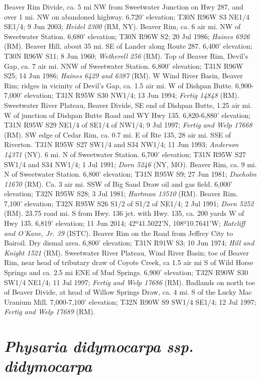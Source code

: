 Beaver Rim Divide, ca. 5 mi NW from Sweetwater Junction on Hwy 287, and over 1
mi. NW on abandoned highway. 6,720' elevation; T30N R96W S3 NE1/4 SE1/4;
9 Jun 2003; \textit{Heidel 2300} (RM, NY).
Beaver Rim, ca. 6 air mi. NW of Sweetwater Station. 6,680' elevation;
T30N R96W S2; 20 Jul 1986; \textit{Haines 6926} (RM).
Beaver Hill, about 35 mi. SE of Lander along Route 287. 6,400' elevation;
T30N R96W S11; 8 Jun 1960; \textit{Wetherell 256} (RM).
Top of Beaver Rim, Devil's Gap, ca. 7 air mi. NNW of Sweetwater Station.
6,800' elevation; T31N R96W S25; 14 Jun 1986;
\textit{Haines 6429 and 6387} (RM).
W Wind River Basin, Beaver Rim; ridges in vicinity of Devil's Gap, ca. 1.5 air
mi. W of Dishpan Butte. 6,900-7,000' elevation; T31N R95W S30 NW1/4;
13 Jun 1994; \textit{Fertig 14848} (RM).
Sweetwater River Plateau, Beaver Divide, SE end of Dishpan Butte, 1.25 air mi.
W of junction of Dishpan Butte Road and WY Hwy 135. 6,820-6,880' elevation;
T31N R95W S29 NE1/4 of SE1/4 of NW1/4; 9 Jul 1997;
\textit{Fertig and Welp 17668} (RM).
SW edge of Cedar Rim, ca. 0.7 mi. E of Rte 135, 28 air mi. SSE of Riverton.
T31N R95W S27 SW1/4 and S34 NW1/4; 11 Jun 1993; \textit{Anderson 14371} (NY).
6 mi. N of Sweetwater Station. 6,700' elevation; T31N R95W S27 SW1/4 and S34
NW1/4; 1 Jul 1991; \textit{Dorn 5246} (NY, MO).
Beaver Rim, ca. 9 mi. N of Sweetwater Station. 6,800' elevation; T31N R95W S9;
27 Jun 1981; \textit{Dueholm 11670} (RM).
Ca. 3 air mi. SSW of Big Sand Draw oil and gas field. 6,000' elevation;
T32N R95W S28; 3 Jul 1981; \textit{Hartman 13510} (RM).
Beaver Rim. 7,100' elevation; T32N R95W S26 S1/2 of S1/2 of NE1/4; 2 Jul 1991;
\textit{Dorn 5252} (RM).
23.75 road mi. S from Hwy. 136 jct. with Hwy. 135, ca. 200 yards W of Hwy 135.
6,819' elevation; 11 Jun 2014; 42º41.5022'N, 108º10.7641'W;
\textit{Ratcliff and O'Kane, Jr. 39} (ISTC).
Beaver Rim on the Road from Jeffrey City to Bairoil. Dry dismal area.
6,800' elevation; T31N R91W S3; 10 Jun 1974; \textit{Hill and Knight 1521} (RM).
Sweetwater River Plateau, Wind River Basin; toe of Beaver Rim, near head of
tributary draw of Coyote Creek, ca 1.5 air mi S of Wild Horse Springs and ca.
2.5 mi ENE of Mud Springs. 6,900' elevation; T32N R90W S30 SW1/4 NE1/4;
11 Jul 1997; \textit{Fertig and Welp 17686} (RM).
Badlands on north toe of Beaver Divide, at head of Willow Springs Draw, ca. 4
mi. S of the Lucky Mac Uranium Mill. 7,000-7,100' elevation; T32N R90W S9 SW1/4
SE1/4; 12 Jul 1997; \textit{Fertig and Welp 17689} (RM).

\section*{\textit{Physaria didymocarpa ssp. didymocarpa}}

